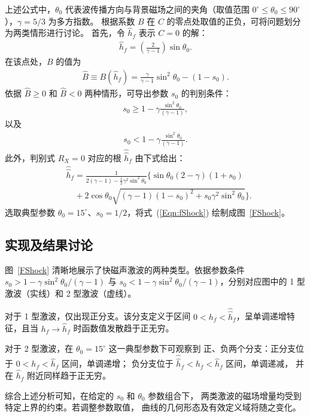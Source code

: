 \documentclass{article}
\begin{document}
上述公式中，$\theta_0$ 代表波传播方向与背景磁场之间的夹角（取值范围
$0^\circ \le \theta_0 \le 90^\circ$），$\gamma=5/3$ 为多方指数。
根据系数 $B$ 在 $C$ 的零点处取值的正负，可将问题划分为两类情形进行讨论。
首先，令 $\hat{h}_f$ 表示 $C=0$ 的解：
\begin{align}
\hat{h}_f = \left(\frac{2}{\gamma-1}\right) \sin\theta_0.
\end{align}
在该点处，$B$ 的值为
\begin{align*}
\hat{B} \equiv B(\hat{h}_f) = \frac{\gamma}{\gamma-1} \sin^2\theta_0 - (1-s_0).
\end{align*}
依据 $\hat{B} \ge 0$ 和 $\hat{B} < 0$ 两种情形，可导出参数 $s_0$ 的判别条件：
\begin{align}
s_0 \ge 1 - \gamma \frac{\sin^2\theta_0}{(\gamma-1)},
\end{align}
以及
\begin{align}
s_0 < 1 - \gamma \frac{\sin^2\theta_0}{(\gamma-1)}.
\end{align}
此外，判别式 $R_X=0$ 对应的根 $\hat{\hat{h}}_f$ 由下式给出：
\begin{align}
& \hat{\hat{h}}_f = \frac{1}{2(\gamma-1) - \frac{1}{2} \gamma^2 \sin^2
\theta_0}\Big\{\sin\theta_0
(2-\gamma)(1+s_0) \nonumber
\\
& \quad + 2\cos\theta_0 \sqrt{(\gamma-1)(1-s_0)^2 + s_0 \gamma^2 \sin^2\theta_0}\Big\}.
\end{align}
选取典型参数 $\theta_0=15^\circ$、$s_{0}=1/2$，将式~(\ref{Eqn:fShock})
绘制成图~\ref{FShock}。

\subsection{实现及结果讨论}

图~\ref{FShock} 清晰地展示了快磁声激波的两种类型。依据参数条件
$s_0 > 1 - \gamma\sin^2\theta_0/(\gamma-1)$ 与
$s_0 < 1 - \gamma\sin^2\theta_0/(\gamma-1)$，分别对应图中的
1 型激波（实线）和 2 型激波（虚线）。

对于 1 型激波，仅出现正分支。该分支定义于区间
$0 < h_f < \hat{\hat{h}}_f$，呈单调递增特征，且当 $h_f \to \hat{h}_f$
时函数值发散趋于正无穷。

对于 2 型激波，在 $\theta_0 = 15^\circ$ 这一典型参数下可观察到
正、负两个分支：正分支位于 $0 < h_f < \hat{h}_f$ 区间，单调递增；
负分支位于 $\hat{\hat{h}}_f < h_f < \hat{h}_f$ 区间，单调递减，
并在 $\hat{h}_f$ 附近同样趋于正无穷。

综合上述分析可知，在给定的 $s_0$ 和 $\theta_0$ 参数组合下，
两类激波的磁场增量均受到特定上界的约束。若调整参数取值，
曲线的几何形态及有效定义域将随之变化。
\end{document}
